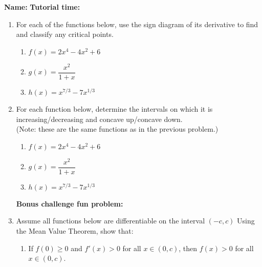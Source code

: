 \documentclass[12pt]{article}
\begin{document}
{\bf \large Name:} \hspace{2.5in} {\bf Tutorial time:}

\bigskip

\bigskip

\thispagestyle{fancy}

 \begin{enumerate}
  \item For each of the functions below, use the sign diagram of its derivative to find and classify any critical points.
\begin{enumerate}
 \item $f(x) = 2x^4-4x^2+6$

\vspace{2.5in}

 \item $g(x) = \dfrac{x^2}{1+x}$

\vspace{2.5in}

 \item $h(x) = x^{7/3}-7x^{1/3}$
\end{enumerate}

\newpage

 \item For each function below, determine the intervals on which it is increasing/decreasing and concave up/concave down.\\
(Note: these are the same functions as in the previous problem.)

\begin{enumerate}
 \item $f(x) = 2x^4-4x^2+6$

\vspace{2.5in}

 \item $g(x) = \dfrac{x^2}{1+x}$

\vspace{2.5in}

 \item $h(x) = x^{7/3}-7x^{1/3}$
\end{enumerate}


\newpage

\textbf{Bonus challenge fun problem:}

 \item Assume all functions below are differentiable on the interval $(-c,c)$ Using the Mean Value Theorem, show that:
\begin{enumerate}
 \item If $f(0)\geq 0$ and $f'(x)>0$ for all $x\in (0,c)$, then $f(x)>0$ for all $x\in (0,c)$.


\end{enumerate}
\end{enumerate}
\end{document}

